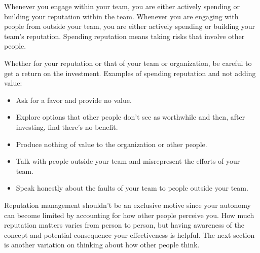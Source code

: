Whenever you engage within your team, you are either actively spending or building your reputation within the team.
Whenever you are engaging with people from outside your team, you are either actively spending or building your team's reputation.
Spending reputation means taking risks that involve other people.


Whether for your reputation or that of your team or organization, be careful to get a return on the investment. 
Examples of spending reputation and not adding value:
\begin{itemize}
    \item Ask for a favor and provide no value.
    \item Explore options that other people don't see as worthwhile and then, after investing, find there's no benefit.
    \item Produce nothing of value to the organization or other people.
    \item Talk with people outside your team and misrepresent the efforts of your team.
    \item Speak honestly about the faults of your team to people outside your team.
\end{itemize}












Reputation management shouldn't be an exclusive motive since your autonomy can become limited by accounting for how other people perceive you. How much reputation matters varies from person to person, but having awareness of the concept and potential consequence your effectiveness is helpful. The next section is another variation on thinking about how other people think. 

